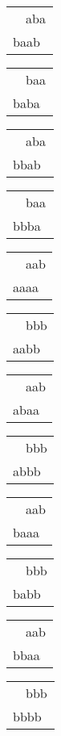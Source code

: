 \begin{tabular}{|l|} \hline
\ \ aba \\
baab\  \\
\hline
\end{tabular} 
\begin{tabular}{|l|} \hline
\ \ baa \\
baba\  \\
\hline
\end{tabular} 
\begin{tabular}{|l|} \hline
\ \ aba \\
bbab\  \\
\hline
\end{tabular} 
\begin{tabular}{|l|} \hline
\ \ baa \\
bbba\  \\
\hline
\end{tabular} 
\begin{tabular}{|l|} \hline
\ \ aab \\
aaaa\  \\
\hline
\end{tabular} 
\begin{tabular}{|l|} \hline
\ \ bbb \\
aabb\  \\
\hline
\end{tabular} 
\begin{tabular}{|l|} \hline
\ \ aab \\
abaa\  \\
\hline
\end{tabular} 
\begin{tabular}{|l|} \hline
\ \ bbb \\
abbb\  \\
\hline
\end{tabular} 
\begin{tabular}{|l|} \hline
\ \ aab \\
baaa\  \\
\hline
\end{tabular} 
\begin{tabular}{|l|} \hline
\ \ bbb \\
babb\  \\
\hline
\end{tabular} 
\begin{tabular}{|l|} \hline
\ \ aab \\
bbaa\  \\
\hline
\end{tabular} 
\begin{tabular}{|l|} \hline
\ \ bbb \\
bbbb\  \\
\hline
\end{tabular} 
